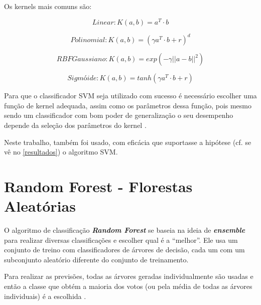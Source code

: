 Os kernels mais comuns são: \cite{geron_maos_2020}

\begin{equation}\label{eq:kernel-linear}
Linear: K(a,b) = a^T \cdot b
\end{equation} 

\begin{equation}\label{eq:kernel-polinomial}
Polinomial: K(a,b) = (\gamma a^T \cdot b + r)^d
\end{equation} 

\begin{equation}\label{eq:kernel-rbf}
RBF Gaussiano: K(a,b) = exp(- \gamma || a - b ||^2)
\end{equation} 

\begin{equation}\label{eq:kernel-sigmoide}
Sigmóide: K(a,b) = tanh(\gamma a^T \cdot b + r)
\end{equation} 


Para que o classificador SVM seja utilizado com sucesso é necessário escolher uma função de kernel adequada, assim como os parâmetros dessa função, pois mesmo sendo um classificador com bom poder de generalização o seu desempenho depende da seleção dos parâmetros do kernel \cite{soman_machine_2009}. 

Neste trabalho, também foi usado, com eficácia que suportasse a hipótese (cf. se vê no \autoref{resultados}) o algoritmo SVM.

\section{Random Forest - Florestas Aleatórias}\label{random-forest}
O algoritmo de classificação \textbf{\textit{Random Forest}} se baseia na ideia de \textit{\textbf{ensemble}} para realizar diversas classificações e escolher qual é a ``melhor''. Ele usa um conjunto de treino com classificadores de árvores de decisão, cada um com um subconjunto aleatório diferente do conjunto de treinamento. 

Para realizar as previsões, todas as árvores geradas individualmente são usadas e então a classe que obtém a maioria dos votos (ou pela média de todas as árvores individuais) é a escolhida \cite{alpaydin_introduction_2014, bruce_estatistica_2019, geron_maos_2020}.

